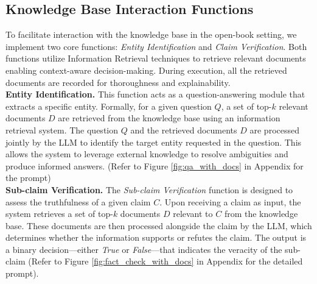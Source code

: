 \documentclass[11pt]{article}
\begin{document}
\subsection{Knowledge Base Interaction Functions}
\label{interaction_function}
To facilitate interaction with the knowledge base in the open-book setting, we implement two core functions: \textit{Entity Identification} and \textit{Claim Verification}. Both functions utilize Information Retrieval techniques to retrieve relevant documents enabling context-aware decision-making. During execution, all the retrieved documents are recorded for thoroughness and explainability.
\\
\textbf{Entity Identification.} This function acts as a question-answering module that extracts a specific entity. Formally, for a given question $Q$, a set of top-$k$ relevant documents $D$ are retrieved from the knowledge base using an information retrieval system. The question $Q$ and the retrieved documents $D$ are processed jointly by the LLM to identify the target entity requested in the question. This allows the system to leverage external knowledge to resolve ambiguities and produce informed answers. (Refer to Figure \ref{fig:qa_with_docs} in Appendix for the prompt)
\\
\textbf{Sub-claim Verification.} The \textit{Sub-claim Verification} function is designed to assess the truthfulness of a given claim $C$. Upon receiving a claim as input, the system retrieves a set of top-$k$ documents $D$ relevant to $C$ from the knowledge base. These documents are then processed alongside the claim by the LLM, which determines whether the information supports or refutes the claim. The output is a binary decision—either \textit{True} or \textit{False}—that indicates the veracity of the sub-claim (Refer to Figure \ref{fig:fact_check_with_docs} in Appendix for the detailed prompt).
\end{document}
